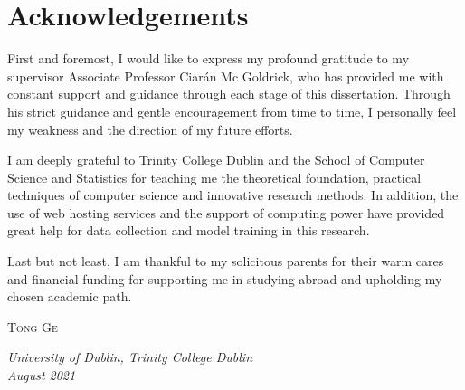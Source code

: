 \chapter{Acknowledgements}
{
\linespread{1.3}
\selectfont
First and foremost, I would like to express my profound gratitude to my supervisor Associate Professor Ciarán Mc Goldrick, who has provided me with constant support and guidance through each stage of this dissertation. Through his strict guidance and gentle encouragement from time to time, I personally feel my weakness and the direction of my future efforts.

I am deeply grateful to Trinity College Dublin and the School of Computer Science and Statistics for teaching me the theoretical foundation, practical techniques of computer science and innovative research methods. In addition, the use of web hosting services and the support of computing power have provided great help for data collection and model training in this research.

Last but not least, I am thankful to my solicitous parents for their warm cares and financial funding for supporting me in studying abroad and upholding my chosen academic path.

\vspace{1.2cm}
\raggedleft \textsc{\large Tong Ge} \\[10mm]

\raggedright \textit{University of Dublin, Trinity College Dublin \\
August 2021}
}
\clearpage